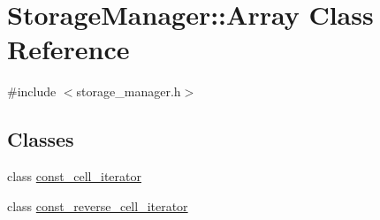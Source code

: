 \hypertarget{classStorageManager_1_1Array}{}\section{Storage\+Manager\+:\+:Array Class Reference}
\label{classStorageManager_1_1Array}


{\ttfamily \#include $<$storage\+\_\+manager.\+h$>$}

\subsection*{Classes}
\begin{DoxyCompactItemize}
\item 
class \hyperlink{classStorageManager_1_1Array_1_1const__cell__iterator}{const\+\_\+cell\+\_\+iterator}
\item 
class \hyperlink{classStorageManager_1_1Array_1_1const__reverse__cell__iterator}{const\+\_\+reverse\+\_\+cell\+\_\+iterator}
\end{DoxyCompactItemize}
